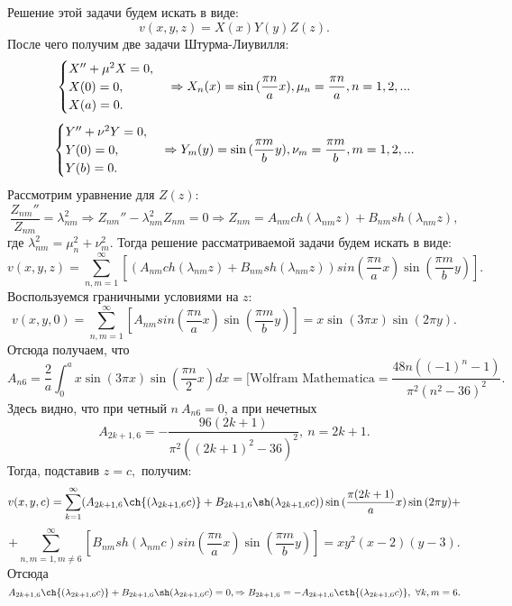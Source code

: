 \documentclass[11pt]{article}
\begin{document}
Решение этой задачи будем искать в виде: $$v(x,y,z)=X(x)Y(y)Z(z).$$
После чего получим две задачи Штурма-Лиувилля:
$$\begin{cases}
    X''+\mu^2X=0,\\
    X(0)=0,\\
    X(a)=0.
\end{cases}\Rightarrow
X_n(x)=\sin{(\frac{\pi n}{a}x)},\\
\mu_n=\frac{\pi n}{a}, n=1, 2, ...$$
$$\begin{cases}
    Y''+\nu^2Y=0,\\
    Y(0)=0,\\
    Y(b)=0.
\end{cases}\Rightarrow
Y_m(y)=\sin{(\frac{\pi m}{b}y)},\\
\nu_m=\frac{\pi m}{b}, m=1, 2, ...$$
Рассмотрим уравнение для $Z(z)$:
$$\frac{Z_{nm}''}{Z_{nm}}=\lambda_{nm}^2\Rightarrow Z_{nm}''-\lambda_{nm}^2Z_{nm}=0\Rightarrow Z_{nm}=A_{nm}ch(\lambda_{nm}z)+B_{nm}sh(\lambda_{nm}z),$$
где $\lambda^2_{nm}=\mu_n^2+\nu_m^2.$
Тогда решение рассматриваемой задачи будем искать в виде:
$$v(x,y,z)=\sum_{n,m=1}^\infty[( A_{nm}ch(\lambda_{nm}z)+B_{nm}sh(\lambda_{nm}z))sin{(\frac{\pi n}{a}x)}\sin{(\frac{\pi m}{b}y)}].$$
Воспользуемся граничными условиями на $z$:
$$v(x,y,0)=\sum_{n,m=1}^\infty[ A_{nm}sin{(\frac{\pi n}{a}x)}\sin{(\frac{\pi m}{b}y)}]=x\sin{(3\pi x)}\sin{(2\pi y)}.$$
Отсюда получаем, что $$A_{n6}=
    \frac{2}{a} \int_0^a x\sin(3\pi x)\sin(\frac{\pi n}{2}x)dx=[\text{Wolfram Mathematica}=\frac{48 n ((-1)^n-1)}{\pi ^2 \left(n^2-36\right)^2}.$$ 
Здесь видно, что при четный $n\ A_{n6}=0$, а при нечетных
$$A_{2k+1,6}=-\frac{96 (2k+1)}{\pi ^2 \left((2k+1)^2-36\right)^2},\ n=2k+1.$$
Тогда, подставив $z=c,$ получим:
$$v(x,y,c)=\sum_{k=1}^\infty (A_{2k+1,6}\ch{(\lambda_{2k+1,6}c)}+B_{2k+1,6}\sh(\lambda_{2k+1,6}c))\sin{(\frac{\pi (2k+1)}{a} x)}\sin{(2\pi y)}+$$
$$+\sum_{n,m=1, m \neq 6}^\infty[ B_{nm}sh(\lambda_{nm}c)sin{(\frac{\pi n}{a}x)}\sin{(\frac{\pi m}{b}y)}]=xy^2(x-2)(y-3).$$
Отсюда $A_{2k+1, 6}\ch{(\lambda_{2k+1, 6}c)}+B_{2k+1,6}\sh(\lambda_{2k+1, 6}c)=0, \Rightarrow B_{2k+1,6}=-A_{2k+1,6}\cth{(\lambda_{2k+1,6}c)},\ \forall k, m=6.$
\end{document}
